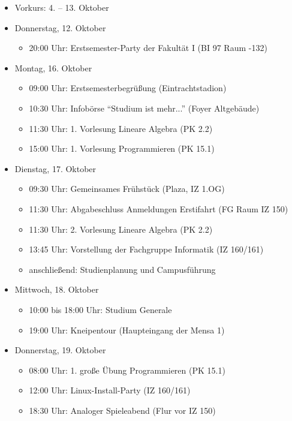 \begin{itemize}
	\item Vorkurs: 4. – 13. Oktober
	\item Donnerstag, 12. Oktober
	\begin{itemize}
		\item 20:00 Uhr: Erstsemester-Party der Fakultät I (BI 97 Raum -132)
	\end{itemize}
	\item Montag, 16. Oktober
	\begin{itemize}
		\item 09:00 Uhr: Erstsemesterbegrüßung (Eintrachtstadion)
        \item 10:30 Uhr: Infobörse \enquote{Studium ist mehr...} (Foyer Altgebäude)
        \item 11:30 Uhr: 1. Vorlesung Lineare Algebra (PK 2.2)
        \item 15:00 Uhr: 1. Vorlesung Programmieren (PK 15.1)
	\end{itemize}
	\item Dienstag, 17. Oktober
	\begin{itemize}
		\item 09:30 Uhr: Gemeinsames Frühstück (Plaza, IZ 1.OG)
        \item 11:30 Uhr: Abgabeschluss Anmeldungen Erstifahrt (FG Raum IZ 150)
        \item 11:30 Uhr: 2. Vorlesung Lineare Algebra (PK 2.2)
        \item 13:45 Uhr: Vorstellung der Fachgruppe Informatik (IZ 160/161)
        \item anschließend: Studienplanung und Campusführung
	\end{itemize}
	\item Mittwoch, 18. Oktober
	\begin{itemize}
		\item 10:00 bis 18:00 Uhr: Studium Generale
        \item 19:00 Uhr: Kneipentour (Haupteingang der Mensa 1)
	\end{itemize}
	\item Donnerstag, 19. Oktober
	\begin{itemize}
		\item 08:00 Uhr: 1. große Übung Programmieren (PK 15.1)
        \item 12:00 Uhr: Linux-Install-Party (IZ 160/161)
        \item 18:30 Uhr: Analoger Spieleabend (Flur vor IZ 150)
	\end{itemize}

\end{itemize}
